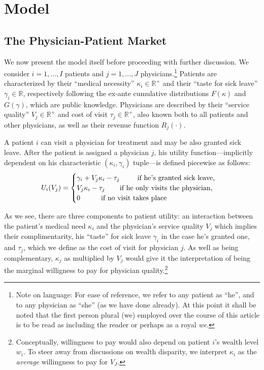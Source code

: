 \documentclass[../main.tex]{subfiles}
\begin{document}
\section{Model}

\subsection{The Physician-Patient Market}
\label{sec:3_1}

We now present the model itself before proceeding with further discussion. We consider $i = 1, ..., I$ patients and $j = 1, ..., J$ physicians.\footnote{Note on language: For ease of reference, we refer to any patient as ``he'', and to any physician as ``she'' (as we have done already). At this point it shall be noted that the first person plural (we) employed over the course of this article is to be read as including the reader or perhaps as a royal \textit{we}.} Patients are characterized by their ``medical necessity'' $\kappa_i \in \mathbb{R}^+$ and their ``taste for sick leave'' $\gamma_i \in \mathbb{R}$, respectively following the ex-ante cumulative distributions $F(\kappa)$ and $G(\gamma)$, which are public knowledge. Physicians are described by their ``service quality'' $V_j \in \mathbb{R}^+$ and cost of visit $\tau_j \in \mathbb{R}^+$, also known both to all patients and other physicians, as well as their revenue function $R_j(\cdot)$.

A patient $i$ can visit a physician for treatment and may be also granted sick leave. After the patient is assigned a physician $j$, his utility function—implicitly dependent on his characteristic $(\kappa_i,\gamma_i)$ tuple—is defined piecewise as follows:
    \[
U_i(V_j) =\begin{cases}
\gamma_i + V_j \kappa_i - \tau_j \text{  \hspace{0.65cm} if he's granted sick leave,} \\
V_j \kappa_i - \tau_j \text{  \hspace{0.5cm} if he only visits the physician,} \\
0 \text{  \hspace{0.8cm} if no visit takes place}
\end{cases}
\]

As we see, there are three components to patient utility: an interaction between the patient's medical need $\kappa_i$ and the physician's service quality $V_j$ which implies their complimentarity, his ``taste'' for sick leave $\gamma_i$ in the case he's granted one, and $\tau_j$, which we define as the cost of visit for physician $j$. As well as being complementary, $\kappa_j$ as multiplied by $V_j$ would give it the interpretation of being the marginal willigness to pay for physician quality.\footnote{Conceptually, willingness to pay would also depend on patient $i$'s wealth level $w_i$. To steer away from discussions on wealth disparity, we interpret $\kappa_i$ as the \textit{average} willingness to pay for $V_J$.}
\end{document}
